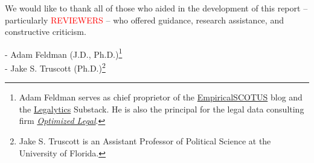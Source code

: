 \noindent We would like to thank all of those who aided in the development of this report -- particularly \textcolor{red}{REVIEWERS} --  who offered guidance, research assistance, and constructive criticism. \\

\begin{flushright}
- Adam Feldman (J.D., Ph.D.)\footnote{Adam Feldman serves as chief proprietor of the \href{https://empiricalscotus.com/}{EmpiricalSCOTUS} blog and the \href{https://legalytics.substack.com/}{Legalytics} Substack. He is also the principal for the legal data consulting firm \href{https://empiricalscotus.com/optimizedlegal/}{\emph{Optimized Legal}}.}\\
- Jake S. Truscott (Ph.D.)\footnote{Jake S. Truscott is an Assistant Professor of Political Science at the University of Florida.}
\end{flushright}
